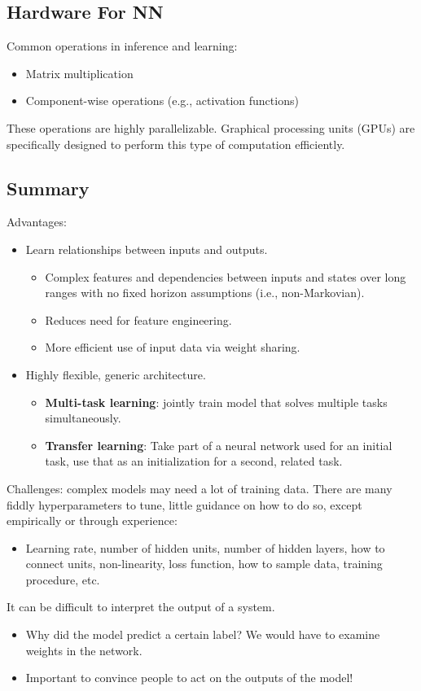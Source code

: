 \documentclass{article}
\begin{document}
\subsection{Hardware For NN}
Common operations in inference and learning:
\begin{itemize}
    \item Matrix multiplication
    \item Component-wise operations (e.g., activation functions)
\end{itemize}
These operations are highly parallelizable. Graphical processing units (GPUs) are specifically designed to perform this type of computation efficiently.
\subsection{Summary}
Advantages:
\begin{itemize}
    \item Learn relationships between inputs and outputs.
    \begin{itemize}
        \item Complex features and dependencies between inputs and states over long ranges with no fixed horizon assumptions (i.e., non-Markovian).
        \item Reduces need for feature engineering.
        \item More efficient use of input data via weight sharing.
    \end{itemize}
    \item Highly flexible, generic architecture.
    \begin{itemize}
        \item \textbf{Multi-task learning}: jointly train model that solves multiple tasks simultaneously.
        \item \textbf{Transfer learning}: Take part of a neural network used for an initial task, use that as an initialization for a second, related task.
    \end{itemize}
\end{itemize}
Challenges: complex models may need a lot of training data. There are many fiddly hyperparameters to tune, little guidance on how to do so, except empirically or through experience:
\begin{itemize}
    \item Learning rate, number of hidden units, number of hidden layers, how to connect units, non-linearity, loss function, how to sample data, training procedure, etc.
\end{itemize}
It can be difficult to interpret the output of a system.
\begin{itemize}
    \item Why did the model predict a certain label? We would have to examine weights in the network.
    \item Important to convince people to act on the outputs of the model!
\end{itemize}
\end{document}
